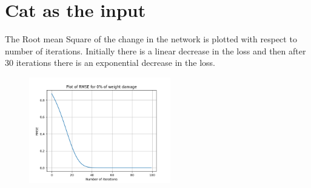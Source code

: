 \documentclass{article}
\begin{document}
\section{Cat as the input}
\begin{figure}[H]
\hspace{0.001\textwidth}
\end{figure}


The Root mean Square of the change in the network is plotted with respect to number of iterations. Initially there is a linear decrease in the loss and then after 30 iterations there is an exponential decrease in the loss.
\begin{figure}[H]
\includegraphics[width=0.55\textwidth]{cat_loss.png}
\centering
\end{figure}
\end{document}
